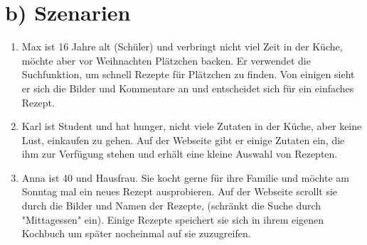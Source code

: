 \documentclass[parskip,10pt,abstracton]{scrartcl}
\begin{document}
\pagebreak
\section*{b) Szenarien}

\begin{enumerate}[(1)]
 \item Max ist 16 Jahre alt (Schüler) und verbringt nicht viel Zeit in der Küche, möchte aber vor Weihnachten Plätzchen backen. Er verwendet die Suchfunktion, um schnell Rezepte für Plätzchen zu finden. Von einigen sieht er sich die Bilder und Kommentare an und entscheidet sich für ein einfaches Rezept.
 
 
 \item Karl ist Student und hat hunger, nicht viele Zutaten in der Küche, aber keine Lust, einkaufen zu gehen. Auf der Webseite gibt er einige Zutaten ein, die ihm zur Verfügung stehen und erhält eine kleine Auswahl von Rezepten.
 
 
 \item Anna ist 40 und Hausfrau. Sie kocht gerne für ihre Familie und möchte am Sonntag mal ein neues Rezept ausprobieren. Auf der Webseite scrollt sie durch die Bilder und Namen der Rezepte, (schränkt die Suche durch "Mittagessen" ein). Einige Rezepte speichert sie sich in ihrem eigenen Kochbuch um später nocheinmal auf sie zuzugreifen.
 
\end{enumerate}
\end{document}
